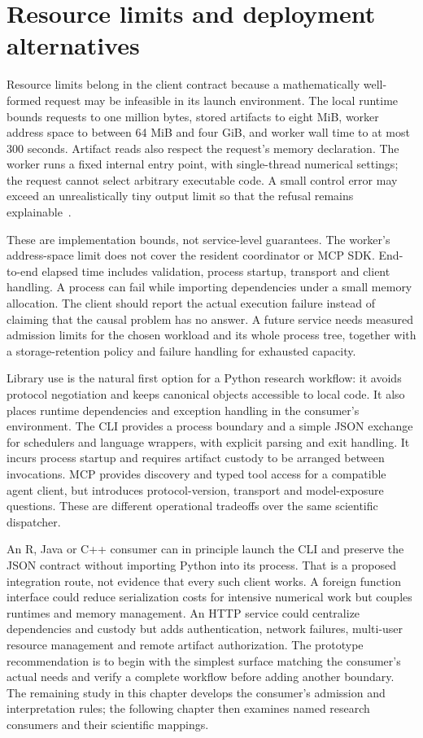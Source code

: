 \section{Resource limits and deployment alternatives}

Resource limits belong in the client contract because a mathematically
well-formed request may be infeasible in its launch environment. The local
runtime bounds requests to one million bytes, stored artifacts to eight
MiB, worker address space to between 64 MiB and four GiB, and worker wall
time to at most 300 seconds. Artifact reads also respect the request's
memory declaration. The worker runs a fixed internal entry point, with
single-thread numerical settings; the request cannot select arbitrary
executable code. A small control error may exceed an unrealistically tiny
output limit so that the refusal remains explainable~\citep{exec13_i2_examples}.

These are implementation bounds, not service-level guarantees. The worker's
address-space limit does not cover the resident coordinator or MCP SDK.
End-to-end elapsed time includes validation, process startup, transport and
client handling. A process can fail while importing dependencies under a
small memory allocation. The client should report the actual execution
failure instead of claiming that the causal problem has no answer. A future
service needs measured admission limits for the chosen workload and its
whole process tree, together with a storage-retention policy and failure
handling for exhausted capacity.

Library use is the natural first option for a Python research workflow: it
avoids protocol negotiation and keeps canonical objects accessible to local
code. It also places runtime dependencies and exception handling in the
consumer's environment. The CLI provides a process boundary and a simple
JSON exchange for schedulers and language wrappers, with explicit parsing
and exit handling. It incurs process startup and requires artifact custody
to be arranged between invocations. MCP provides discovery and typed tool
access for a compatible agent client, but introduces protocol-version,
transport and model-exposure questions. These are different operational
tradeoffs over the same scientific dispatcher.

An R, Java or C++ consumer can in principle launch the CLI and preserve the
JSON contract without importing Python into its process. That is a proposed
integration route, not evidence that every such client works. A foreign
function interface could reduce serialization costs for intensive numerical
work but couples runtimes and memory management. An HTTP service could
centralize dependencies and custody but adds authentication, network
failures, multi-user resource management and remote artifact authorization.
The prototype recommendation is to begin with the simplest surface matching
the consumer's actual needs and verify a complete workflow before adding
another boundary. The remaining study in this chapter develops the consumer's admission and interpretation rules; the following chapter then examines named research consumers and their scientific mappings.

